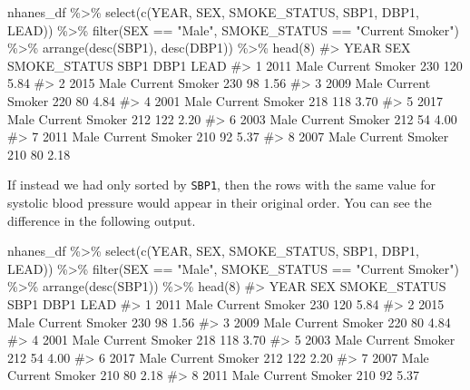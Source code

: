 \documentclass[
  letterpaper,
]{latex/krantz}
\makeatletter
\newenvironment{Shaded}{\begin{snugshade}}{\end{snugshade}}
\newcommand{\CommentTok}[1]{\textcolor[rgb]{0.37,0.37,0.37}{#1}}
\newcommand{\DecValTok}[1]{\textcolor[rgb]{0.68,0.00,0.00}{#1}}
\newcommand{\FunctionTok}[1]{\textcolor[rgb]{0.28,0.35,0.67}{#1}}
\newcommand{\NormalTok}[1]{\textcolor[rgb]{0.00,0.23,0.31}{#1}}
\newcommand{\SpecialCharTok}[1]{\textcolor[rgb]{0.37,0.37,0.37}{#1}}
\newcommand{\StringTok}[1]{\textcolor[rgb]{0.13,0.47,0.30}{#1}}
\newenvironment{kframe}{%
\medskip{}
\setlength{\fboxsep}{.8em}
 \def\at@end@of@kframe{}%
 \ifinner\ifhmode%
  \def\at@end@of@kframe{\end{minipage}}%
  \begin{minipage}{\columnwidth}%
 \fi\fi%
 \def\FrameCommand##1{\hskip\@totalleftmargin \hskip-\fboxsep
 \colorbox{shadecolor}{##1}\hskip-\fboxsep
     \hskip-\linewidth \hskip-\@totalleftmargin \hskip\columnwidth}%
 \MakeFramed {\advance\hsize-\width
   \@totalleftmargin\z@ \linewidth\hsize
   \@setminipage}}%
 {\par\unskip\endMakeFramed%
 \at@end@of@kframe}
\renewenvironment{Shaded}{\begin{kframe}}{\end{kframe}}
\makeatother
\begin{document}
\begin{Shaded}
\begin{Highlighting}[]
\NormalTok{nhanes\_df }\SpecialCharTok{\%\textgreater{}\%} 
  \FunctionTok{select}\NormalTok{(}\FunctionTok{c}\NormalTok{(YEAR, SEX, SMOKE\_STATUS, SBP1, DBP1, LEAD)) }\SpecialCharTok{\%\textgreater{}\%}
  \FunctionTok{filter}\NormalTok{(SEX }\SpecialCharTok{==} \StringTok{"Male"}\NormalTok{, SMOKE\_STATUS }\SpecialCharTok{==} \StringTok{"Current Smoker"}\NormalTok{) }\SpecialCharTok{\%\textgreater{}\%}
  \FunctionTok{arrange}\NormalTok{(}\FunctionTok{desc}\NormalTok{(SBP1), }\FunctionTok{desc}\NormalTok{(DBP1)) }\SpecialCharTok{\%\textgreater{}\%}
  \FunctionTok{head}\NormalTok{(}\DecValTok{8}\NormalTok{)}
\CommentTok{\#\textgreater{}   YEAR  SEX   SMOKE\_STATUS SBP1 DBP1 LEAD}
\CommentTok{\#\textgreater{} 1 2011 Male Current Smoker  230  120 5.84}
\CommentTok{\#\textgreater{} 2 2015 Male Current Smoker  230   98 1.56}
\CommentTok{\#\textgreater{} 3 2009 Male Current Smoker  220   80 4.84}
\CommentTok{\#\textgreater{} 4 2001 Male Current Smoker  218  118 3.70}
\CommentTok{\#\textgreater{} 5 2017 Male Current Smoker  212  122 2.20}
\CommentTok{\#\textgreater{} 6 2003 Male Current Smoker  212   54 4.00}
\CommentTok{\#\textgreater{} 7 2011 Male Current Smoker  210   92 5.37}
\CommentTok{\#\textgreater{} 8 2007 Male Current Smoker  210   80 2.18}
\end{Highlighting}
\end{Shaded}

If instead we had only sorted by \texttt{SBP1}, then the rows with the
same value for systolic blood pressure would appear in their original
order. You can see the difference in the following output.

\begin{Shaded}
\begin{Highlighting}[]
\NormalTok{nhanes\_df }\SpecialCharTok{\%\textgreater{}\%} 
  \FunctionTok{select}\NormalTok{(}\FunctionTok{c}\NormalTok{(YEAR, SEX, SMOKE\_STATUS, SBP1, DBP1, LEAD)) }\SpecialCharTok{\%\textgreater{}\%}
  \FunctionTok{filter}\NormalTok{(SEX }\SpecialCharTok{==} \StringTok{"Male"}\NormalTok{, SMOKE\_STATUS }\SpecialCharTok{==} \StringTok{"Current Smoker"}\NormalTok{) }\SpecialCharTok{\%\textgreater{}\%}
  \FunctionTok{arrange}\NormalTok{(}\FunctionTok{desc}\NormalTok{(SBP1)) }\SpecialCharTok{\%\textgreater{}\%}
  \FunctionTok{head}\NormalTok{(}\DecValTok{8}\NormalTok{)}
\CommentTok{\#\textgreater{}   YEAR  SEX   SMOKE\_STATUS SBP1 DBP1 LEAD}
\CommentTok{\#\textgreater{} 1 2011 Male Current Smoker  230  120 5.84}
\CommentTok{\#\textgreater{} 2 2015 Male Current Smoker  230   98 1.56}
\CommentTok{\#\textgreater{} 3 2009 Male Current Smoker  220   80 4.84}
\CommentTok{\#\textgreater{} 4 2001 Male Current Smoker  218  118 3.70}
\CommentTok{\#\textgreater{} 5 2003 Male Current Smoker  212   54 4.00}
\CommentTok{\#\textgreater{} 6 2017 Male Current Smoker  212  122 2.20}
\CommentTok{\#\textgreater{} 7 2007 Male Current Smoker  210   80 2.18}
\CommentTok{\#\textgreater{} 8 2011 Male Current Smoker  210   92 5.37}
\end{Highlighting}
\end{Shaded}
\end{document}
